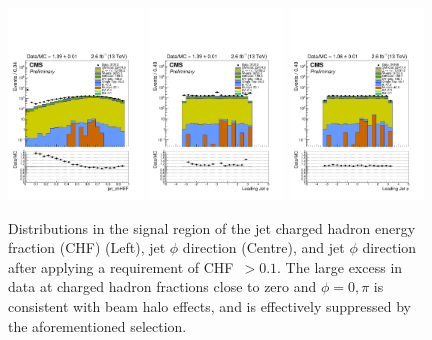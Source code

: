 \begin{figure}[h!]
    \begin{center}
        {\includegraphics[width=0.32\textwidth]{figures/selection/jet_chHEF_mono_all_before.pdf}}
        {\includegraphics[width=0.32\textwidth]{figures/selection/jet_phi[0]_mono_all_before.pdf}}
        {\includegraphics[width=0.32\textwidth]{figures/selection/jet_phi[0]_mono_all_after.pdf}}
        \caption{Distributions in the signal region of the jet charged hadron
        energy fraction (CHF) (Left), jet $\phi$ direction (Centre), and jet $\phi$
        direction after applying a requirement of {CHF~$>0.1$}. The large excess in data
        at charged hadron fractions close to zero and ${\phi = 0, \pi}$ is consistent with beam
        halo effects, and is effectively suppressed by the aforementioned selection.}
        \label{fig:leadJetCleaning}
    \end{center}
\end{figure}

